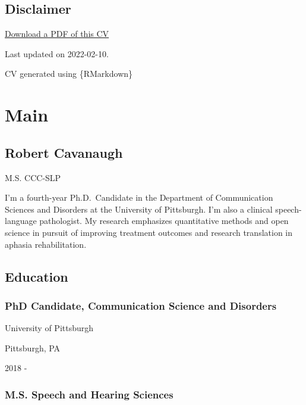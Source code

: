 \documentclass[
]{article}
\begin{document}
\hypertarget{disclaimer}{%
\subsection{Disclaimer}\label{disclaimer}}

\href{https://github.com/rbcavanaugh/personal-website-distill/raw/master/CV/cv.pdf}{
Download a PDF of this CV}

Last updated on 2022-02-10.

CV generated using \{RMarkdown\}

\hypertarget{main}{%
\section{Main}\label{main}}

\hypertarget{title}{%
\subsection{Robert Cavanaugh}\label{title}}

M.S. CCC-SLP

I'm a fourth-year Ph.D.~Candidate in the Department of Communication
Sciences and Disorders at the University of Pittsburgh. I'm also a
clinical speech-language pathologist. My research emphasizes
quantitative methods and open science in pursuit of improving treatment
outcomes and research translation in aphasia rehabilitation.

\hypertarget{education}{%
\subsection{Education}\label{education}}

\hypertarget{phd-candidate-communication-science-and-disorders}{%
\subsubsection{PhD Candidate, Communication Science and
Disorders}\label{phd-candidate-communication-science-and-disorders}}

University of Pittsburgh

Pittsburgh, PA

2018 -

\hypertarget{m.s.-speech-and-hearing-sciences}{%
\subsubsection{M.S. Speech and Hearing
Sciences}\label{m.s.-speech-and-hearing-sciences}}
\end{document}
